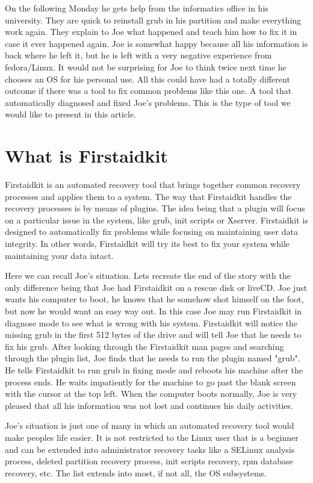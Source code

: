 \documentclass[a4paper,13pt]{article}
\begin{document}
On the following Monday he gets help from the informatics office in his university.  They are quick to reinstall grub in his partition and make everything work again.  They explain to Joe what happened and teach him how to fix it in case it ever happened again.  Joe is somewhat happy because all his information is back where he left it, but he is left with a very negative experience from fedora/Linux.  It would not be surprising for Joe to think twice next time he chooses an OS for his personal use.  All this could have had a totally different outcome if there was a tool to fix common problems like this one.  A tool that automatically diagnosed and fixed Joe's problems.  This is the type of tool we would like to present in this article.

\section{What is Firstaidkit}
Firstaidkit is an automated recovery tool that brings together common recovery processes and applies them to a system.  The way that Firstaidkit handles the recovery processes is by means of plugins.  The idea being that a plugin will focus on a particular issue in the system, like grub, init scripts or Xserver.  Firstaidkit is designed to automatically fix problems while focusing on maintaining user data integrity.  In other words, Firstaidkit will try its best to fix your system while maintaining your data intact.

Here we can recall Joe's situation.  Lets recreate the end of the story with the only difference being that Joe had Firstaidkit on a rescue disk or liveCD.  Joe just wants his computer to boot, he knows that he somehow shot himself on the foot, but now he would want an easy way out.  In this case Joe may run Firstaidkit in diagnose mode to see what is wrong with his system.  Firstaidkit will notice the missing grub in the first 512 bytes of the drive and will tell Joe that he needs to fix his grub.  After looking through the Firstaidkit man pages and searching through the plugin list, Joe finds that he needs to run the plugin named "grub".  He tells Firstaidkit to run grub in fixing mode and reboots his machine after the process ends.  He waits impatiently for the machine to go past the blank screen with the cursor at the top left.  When the computer boots normally, Joe is very pleased that all his information was not lost and continues his daily activities.

Joe's situation is just one of many in which an automated recovery tool would make peoples life easier.  It is not restricted to the Linux user that is a beginner and can be extended into administrator recovery tasks like a SELinux analysis process, deleted partition recovery process, init scripts recovery, rpm database recovery, etc.  The list extends into most, if not all, the OS subsystems.
\end{document}
